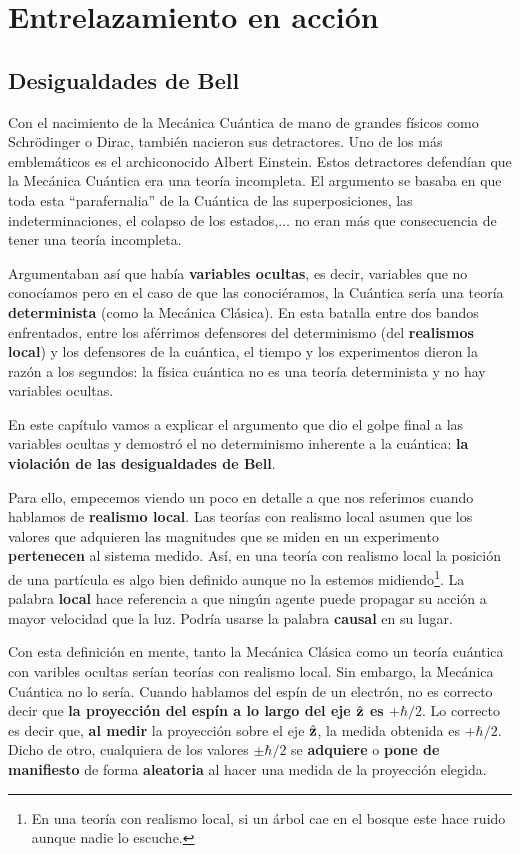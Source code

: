 \documentclass[a4paper,11pt]{book} %
\numberwithin{equation}{chapter}
\begin{document}
\chapter{Entrelazamiento en acción}

    \section{Desigualdades de Bell}

Con el nacimiento de la Mecánica Cuántica de mano de grandes físicos como Schrödinger o Dirac, también nacieron sus detractores. Uno de los más emblemáticos es el archiconocido Albert Einstein. Estos detractores defendían que la Mecánica Cuántica era una teoría incompleta. El argumento se basaba en que toda esta ``parafernalia'' de la Cuántica de las superposiciones, las indeterminaciones, el colapso de los estados,$\dots$ no eran más que consecuencia de tener una teoría incompleta. 

Argumentaban así que había \textbf{variables ocultas}, es decir, variables que no conocíamos pero en el caso de que las conociéramos, la Cuántica sería una teoría \textbf{determinista} (como la Mecánica Clásica). En esta batalla entre dos bandos enfrentados, entre los aférrimos defensores del determinismo (del \textbf{realismos local}) y los defensores de la cuántica, el tiempo y los experimentos dieron la razón a los segundos: la física cuántica no es una teoría determinista y no hay variables ocultas.

En este capítulo vamos a explicar el argumento que dio el golpe final a las variables ocultas y demostró el no determinismo inherente a la cuántica: \textbf{la violación de las desigualdades de Bell}.

Para ello, empecemos viendo un poco en detalle a que nos referimos cuando hablamos de \textbf{realismo local}. Las teorías con realismo local asumen que los valores que adquieren las magnitudes que se miden en un experimento \textbf{pertenecen} al sistema medido. Así, en una teoría con realismo local la posición de una partícula es algo bien definido aunque no la estemos midiendo\footnote{En una teoría con realismo local, si un árbol cae en el bosque este hace ruido aunque nadie lo escuche.}. La palabra \textbf{local} hace referencia a que ningún agente puede propagar su acción a mayor velocidad que la luz. Podría usarse la palabra \textbf{causal} en su lugar. 

Con esta definición en mente, tanto la Mecánica Clásica como un teoría cuántica con varibles ocultas serían teorías con realismo local. Sin embargo, la Mecánica Cuántica no lo sería. Cuando hablamos del espín de un electrón, no es correcto decir que \textbf{la proyección del espín a lo largo del eje $\hat{\bf z}$ es $+\hbar/2$}. Lo correcto es decir que, \textbf{al medir} la proyección sobre el eje $\hat{\bf z}$, la medida obtenida es $+\hbar/2$.  Dicho de otro, cualquiera de los valores $\pm\hbar/2$ se \textbf{adquiere} o \textbf{pone de manifiesto}  de forma \textbf{aleatoria} al hacer una medida de la proyección elegida.
\end{document}
